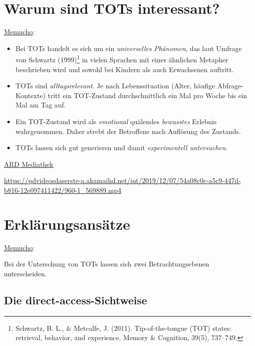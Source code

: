 \documentclass[
  letterpaper,
]{scrbook}
\begin{document}
\hypertarget{warum-sind-tots-interessant}{%
\section{Warum sind TOTs
interessant?}\label{warum-sind-tots-interessant}}

\href{https://memucho.de/Tip-of-the-Tongue-Phaenomen/983\#}{Memucho}:

\begin{itemize}
\item
  Bei TOTs handelt es sich um ein \emph{universelles Phänomen}, das laut
  Umfrage von Schwartz (1999)\footnote{Schwartz, B. L., \& Metcalfe, J.
    (2011). Tip-of-the-tongue (TOT) states: retrieval, behavior, and
    experience. Memory \& Cognition, 39(5), 737--749.} in vielen
  Sprachen mit einer ähnlichen Metapher beschrieben wird und sowohl bei
  Kindern als auch Erwachsenen auftritt.
\item
  TOTs sind \emph{alltagsrelevant}. Je nach Lebenssituation (Alter,
  häufige Abfrage-Kontexte) tritt ein TOT-Zustand durchschnittlich ein
  Mal pro Woche bis ein Mal am Tag auf.
\item
  Ein TOT-Zustand wird als \emph{emotional} quälendes \emph{bewusstes}
  Erlebnis wahrgenommen. Daher strebt der Betroffene nach Auflösung des
  Zustands.
\item
  TOTs lassen sich gut generieren und damit \emph{experimentell
  untersuchen}.
\end{itemize}

\href{https://www.daserste.de/information/wissen-kultur/w-wie-wissen/videos/Gedaechtnisstreiche-video-100.html}{ARD
Mediathek}

\url{https://pdvideosdaserste-a.akamaihd.net/int/2019/12/07/54a08c0c-a5c9-447d-b816-12e097411422/960-1_569889.mp4}

\hypertarget{erkluxe4rungsansuxe4tze}{%
\section{Erklärungsansätze}\label{erkluxe4rungsansuxe4tze}}

\href{https://memucho.de/Tip-of-the-Tongue-Phaenomen/983\#}{Memucho}:

Bei der Unterschung von TOTs lassen sich zwei Betrachtungsebenen
unterscheiden.

\hypertarget{die-direct-access-sichtweise}{%
\subsection{Die
direct-access-Sichtweise}\label{die-direct-access-sichtweise}}
\end{document}

